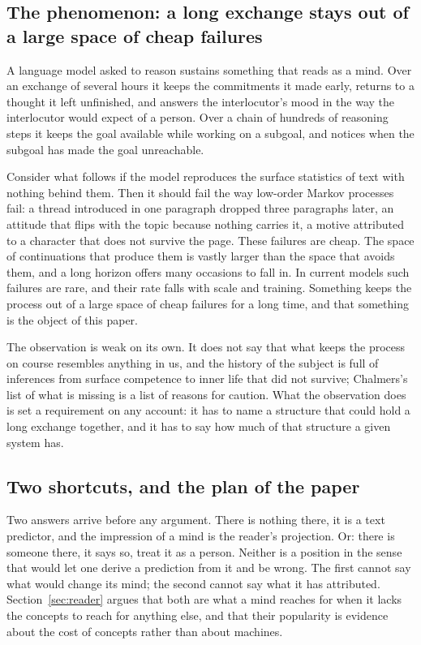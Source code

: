 \subsection{The phenomenon: a long exchange stays out of a large space of cheap failures}

A language model asked to reason sustains something that reads as a mind. Over an exchange of several
hours it keeps the commitments it made early, returns to a thought it left unfinished, and answers the
interlocutor's mood in the way the interlocutor would expect of a person. Over a chain of hundreds of
reasoning steps it keeps the goal available while working on a subgoal, and notices when the subgoal
has made the goal unreachable.

Consider what follows if the model reproduces the surface statistics of text with nothing behind them.
Then it should fail the way low-order Markov processes fail: a thread introduced in one paragraph
dropped three paragraphs later, an attitude that flips with the topic because nothing carries it, a
motive attributed to a character that does not survive the page. These failures are cheap. The space
of continuations that produce them is vastly larger than the space that avoids them, and a long horizon
offers many occasions to fall in. In current models such failures are rare, and their rate falls with
scale and training. Something keeps the process out of a large space of
cheap failures for a long time, and that something is the object of this paper.

The observation is weak on its own. It does not say that what keeps the process on course resembles
anything in us, and the history of the subject is full of inferences from surface competence to inner
life that did not survive; Chalmers's list of what is missing is a list of reasons for caution. What
the observation does is set a requirement on any account: it has to name a structure that could hold
a long exchange together, and it has to say how much of that structure a given system has.

\subsection{Two shortcuts, and the plan of the paper}

Two answers arrive before any argument. There is nothing there, it is a text predictor, and the
impression of a mind is the reader's projection. Or: there is someone there, it says so, treat it as a
person. Neither is a position in the sense that would let one derive a prediction from it and be
wrong. The first cannot say what would change its mind; the second cannot say what it has attributed.
Section~\ref{sec:reader} argues that both are what a mind reaches for when it lacks the concepts to
reach for anything else, and that their popularity is evidence about the cost of concepts rather than
about machines.


